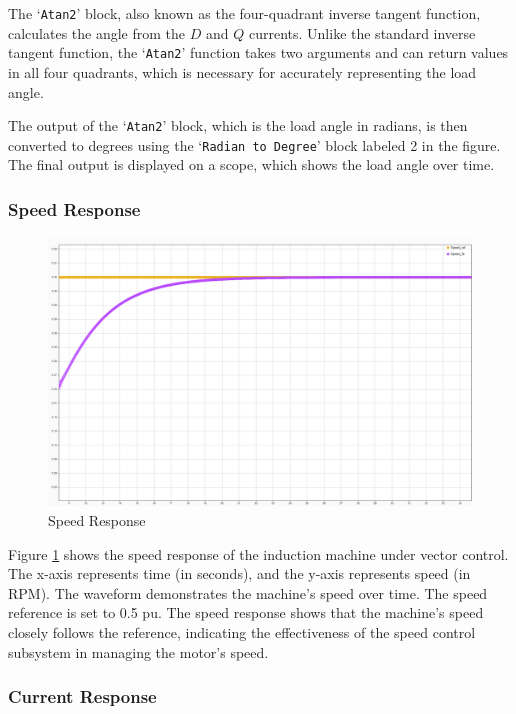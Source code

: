 The `\texttt{Atan2}' block, also known as the four-quadrant inverse tangent function, calculates the angle from the $D$ and $Q$ currents. Unlike the standard inverse tangent function, the `\texttt{Atan2}' function takes two arguments and can return values in all four quadrants, which is necessary for accurately representing the load angle.

The output of the `\texttt{Atan2}' block, which is the load angle in radians, is then converted to degrees using the `\texttt{Radian to Degree}' block labeled 2 in the figure. The final output is displayed on a scope, which shows the load angle over time.




\subsubsection{Speed Response}

\begin{figure}
	\centering
	\includegraphics[width=5in]{sections/section3/images/simulationResutls/SpeedTrackingNoCursor.png}
	\caption{Speed Response}
	\label{fig:speed_response}
\end{figure}

Figure \ref{fig:speed_response} shows the speed response of the induction machine under vector control. The x-axis represents time (in seconds), and the y-axis represents speed (in RPM). The waveform demonstrates the machine's speed over time. The speed reference is set to 0.5 pu. The speed response shows that the machine's speed closely follows the reference, indicating the effectiveness of the speed control subsystem in managing the motor's speed.

\subsubsection{Current Response}

